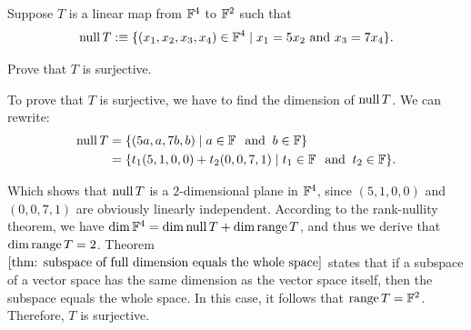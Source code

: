 \begin{xrcs}
  Suppose $T$ is a linear map from $\mathbb{F}^4$ to $\mathbb{F}^2$ such that
  \begin{equation}
    \operatorname{null} T :\equiv \{(x_1, x_2, x_3, x_4) \in \mathbb{F}^4 \mid x_1 = 5x_2 \text{ and } x_3 = 7x_4 \}.
  \end{equation}

  Prove that $T$ is surjective.

  \begin{xprf}
    To prove that $T$ is surjective, we have to find the dimension of $\operatorname{null} T$. We can rewrite:
    \begin{equation}
      \begin{aligned}
        \operatorname{null} T &= \{(5a, a, 7b,b) \mid a \in \mathbb{F} \;\;\, \text{and}\;\; b \in \mathbb{F} \} \\
                  &= \{t_1 (5,1,0,0) + t_2(0,0,7,1) \mid t_1 \in \mathbb{F} \;\;\, \text{and}\;\; t_2 \in \mathbb{F} \}.
      \end{aligned}
    \end{equation}

    Which shows that $\operatorname{null} T$ is a $2$-dimensional plane in $\mathbb{F}^4$, since $(5,1,0,0)$ and $(0,0,7,1)$ are obviously linearly independent. According to the rank-nullity theorem, we have $\dim \mathbb{F}^4 = \dim \operatorname{null} T + \dim \operatorname{range} T$, and thus we derive that $\dim \operatorname{range} T = 2$.
    Theorem $\ref{thm: subspace of full dimension equals the whole space}$ states that if a subspace of a vector space has the same dimension as the vector space itself, then the subspace equals the whole space. In this case, it follows that $\operatorname{range} T = \mathbb{F}^2$. Therefore, $T$ is surjective.
  \end{xprf}
\end{xrcs}

